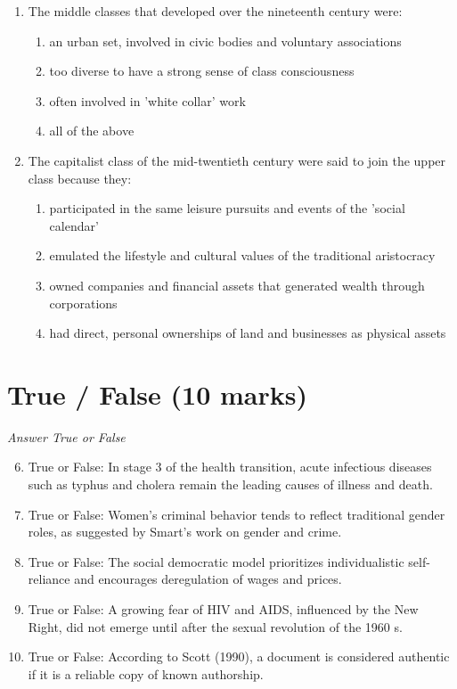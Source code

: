 \documentclass[12pt]{article}
\begin{document}
\begin{enumerate}[label=\arabic*.]
\begin{enumerate}[label=(\alph*)]
\end{enumerate}
\item The middle classes that developed over the nineteenth century were:
\begin{enumerate}[label=(\alph*)]
    \item an urban set, involved in civic bodies and voluntary associations
    \item too diverse to have a strong sense of class consciousness
    \item often involved in 'white collar' work
    \item all of the above
\end{enumerate}
\item The capitalist class of the mid-twentieth century were said to join the upper class because they:
\begin{enumerate}[label=(\alph*)]
    \item participated in the same leisure pursuits and events of the 'social calendar'
    \item emulated the lifestyle and cultural values of the traditional aristocracy
    \item owned companies and financial assets that generated wealth through corporations
    \item had direct, personal ownerships of land and businesses as physical assets
\end{enumerate}
\end{enumerate}

\section*{True / False (10 marks)}
\textit{Answer True or False}
\begin{enumerate}[label=\arabic*.]
\setcounter{enumi}{5}
\item True or False: In stage 3 of the health transition, acute infectious diseases such as typhus and cholera remain the leading causes of illness and death.
\item True or False: Women's criminal behavior tends to reflect traditional gender roles, as suggested by Smart's work on gender and crime.
\item True or False: The social democratic model prioritizes individualistic self-reliance and encourages deregulation of wages and prices.
\item True or False: A growing fear of HIV and AIDS, influenced by the New Right, did not emerge until after the sexual revolution of the 1960 s.
\item True or False: According to Scott (1990), a document is considered authentic if it is a reliable copy of known authorship.
\end{enumerate}
\end{document}
